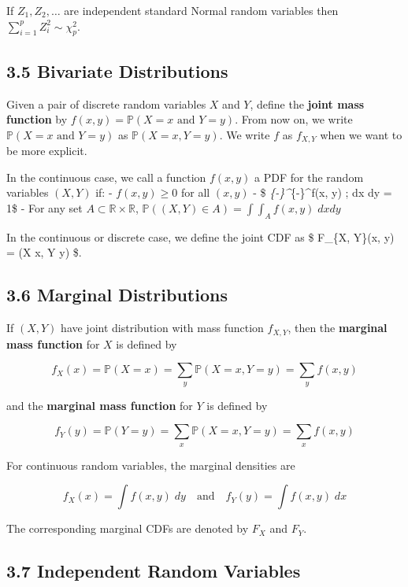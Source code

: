 If \(Z_1, Z_2, \dots\) are independent standard Normal random variables
then \(\sum_{i=1}^p Z_i^2 \sim \chi_p^2\).

\subsection{3.5 Bivariate
Distributions}\label{bivariate-distributions}

Given a pair of discrete random variables \(X\) and \(Y\), define the
\textbf{joint mass function} by
\(f(x, y) = \mathbb{P}(X = x \text{ and } Y = y)\). From now on, we
write \(\mathbb{P}(X = x \text{ and } Y = y)\) as
\(\mathbb{P}(X = x, Y = y)\). We write \(f\) as \(f_{X, Y}\) when we
want to be more explicit.

In the continuous case, we call a function \(f(x, y)\) a PDF for the
random variables \((X, Y)\) if: - \(f(x, y) \geq 0\) for all \((x, y)\)
- \$ \int\emph{\{-\infty\}\^{}\infty \int}\{-\infty\}\^{}\infty f(x, y)
; dx dy = 1\$ - For any set \(A \subset \mathbb{R} \times \mathbb{R}\),
\(\mathbb{P}((X, Y) \in A) = \int \int_A f(x, y) \; dx dy\)

In the continuous or discrete case, we define the joint CDF as \$
F\_\{X, Y\}(x, y) = (X \leq x, Y \leq y) \$.

\subsection{3.6 Marginal Distributions}\label{marginal-distributions}

If \((X, Y)\) have joint distribution with mass function \(f_{X, Y}\),
then the \textbf{marginal mass function} for \(X\) is defined by

\[ f_X(x) = \mathbb{P}(X = x) = \sum_y \mathbb{P}(X = x, Y = y) = \sum_y f(x, y) \]

and the \textbf{marginal mass function} for \(Y\) is defined by

\[ f_Y(y) = \mathbb{P}(Y = y) = \sum_x \mathbb{P}(X = x, Y = y) = \sum_x f(x, y) \]

For continuous random variables, the marginal densities are

\[ f_X(x) = \int f(x, y) \; dy \quad \text{and} \quad f_Y(y) = \int f(x, y) \; dx \]

The corresponding marginal CDFs are denoted by \(F_X\) and \(F_Y\).

\subsection{3.7 Independent Random
Variables}\label{independent-random-variables}


